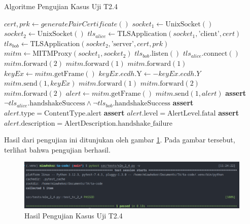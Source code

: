 \begin{algorithm}
  \caption{Algoritme Pengujian Kasus Uji T2.4}
  \label{alg:unit.test.t2.4}
  \begin{algorithmic}
    \State $cert, prk \gets generatePairCertificate()$
    \State $socket_1 \gets \text{UnixSocket}()$
    \State $socket_2 \gets \text{UnixSocket}()$
    \State $tls_{alice} \gets \text{TLSApplication}(socket_1, \text{'client'}, cert)$ 
    \State $tls_{bob} \gets \text{TLSApplication}(socket_2, \text{'server'}, cert, prk)$
    \State $mitm \gets \text{MITMProxy}(socket_1, socket_2)$
    \State
    \State $tls_{bob}.\text{listen}()$  
    \State $tls_{alice}.\text{connect}()$  
    \State
    \State $mitm.\text{forward}(2)$ 
    \State $mitm.\text{forward}(1)$ 
    \State $mitm.\text{forward}(1)$ 
    \State
    \State $keyEx \gets mitm.\text{getFrame}()$ 
    \State $keyEx.ecdh.\text{Y} \gets -keyEx.ecdh.Y$ 
    \State $mitm.\text{send}(1, keyEx)$
    \State
    \State $mitm.\text{forward}(1)$ 
    \State $mitm.\text{forward}(2)$ 
    \State $mitm.\text{forward}(2)$ 
    \State
    \State $alert \gets mitm.\text{getFrame}()$
    \State $mitm.\text{send}(1, alert)$
    \State
    \State \textbf{assert} $\lnot tls_{alice}.\text{handshakeSuccess} \land \lnot tls_{bob}.\text{handshakeSuccess}$
    \State \textbf{assert} $alert.\text{type} = \text{ContentType.alert}$
    \State \textbf{assert} $alert.\text{level} = \text{AlertLevel.fatal}$
    \State \textbf{assert} $alert.\text{description} = \text{AlertDescription.handshake\_failure}$
  \end{algorithmic}
\end{algorithm}

Hasil dari pengujian ini ditunjukan oleh gambar \ref{fig:unit.test.t2.4}. Pada gambar tersebut, terlihat bahwa pengujian berhasil.

\begin{figure}[ht]
  \centering
  \includegraphics[width=\textwidth]{chapters/res/appendix-4/2.4.png}
  \caption{Hasil Pengujian Kasus Uji T2.4}
  \label{fig:unit.test.t2.4}
\end{figure}

